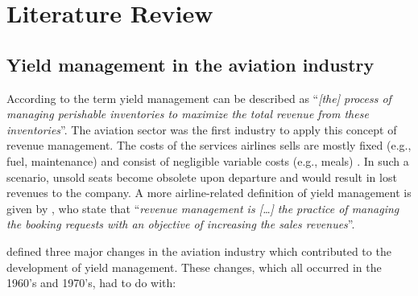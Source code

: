 \chapter{Literature Review}
\label{chap:LiteratureReview}
\section{Yield management in the aviation industry}
According to  the term yield management can be described as ``\textit{[the] process of managing perishable inventories to maximize the total revenue from these inventories}''. The aviation sector was the first industry to apply this concept of revenue management. The costs of the services airlines sells are mostly fixed (e.g., fuel, maintenance) and consist  of negligible variable costs (e.g., meals) \cite{o2001introduction}. In such a scenario, unsold seats become obsolete upon departure and would result in lost revenues to the company. A more airline-related definition of yield management is given by , who state that ``\textit{revenue management is [\ldots] the practice of managing the booking requests with an objective of increasing the sales revenues}''.

 defined three major changes in the aviation industry which contributed to the development of yield management. These changes, which all occurred in the 1960's and 1970's, had to do with:


